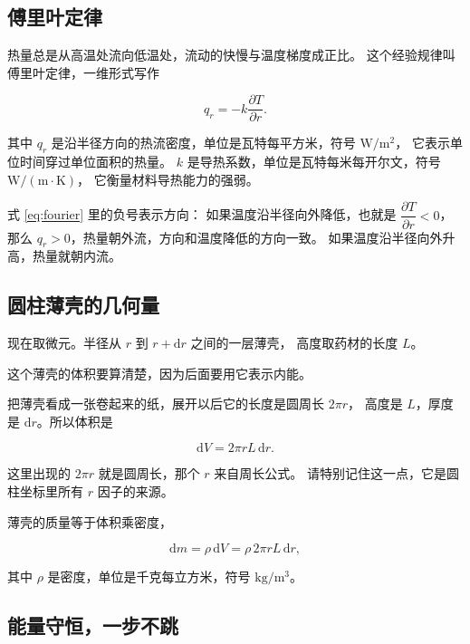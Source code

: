 \subsection{傅里叶定律}

热量总是从高温处流向低温处，流动的快慢与温度梯度成正比。
这个经验规律叫傅里叶定律，一维形式写作

\begin{equation}
q_r = -k\frac{\partial T}{\partial r}.
\label{eq:fourier}
\end{equation}

其中 $q_r$ 是沿半径方向的热流密度，单位是瓦特每平方米，符号 $\mathrm{W/m^2}$，
它表示单位时间穿过单位面积的热量。
$k$ 是导热系数，单位是瓦特每米每开尔文，符号 $\mathrm{W/(m\cdot K)}$，
它衡量材料导热能力的强弱。

式 \eqref{eq:fourier} 里的负号表示方向：
如果温度沿半径向外降低，也就是 $\dfrac{\partial T}{\partial r}<0$，
那么 $q_r>0$，热量朝外流，方向和温度降低的方向一致。
如果温度沿半径向外升高，热量就朝内流。

\subsection{圆柱薄壳的几何量}

现在取微元。半径从 $r$ 到 $r+\mathrm{d}r$ 之间的一层薄壳，
高度取药材的长度 $L$。

这个薄壳的体积要算清楚，因为后面要用它表示内能。

把薄壳看成一张卷起来的纸，展开以后它的长度是圆周长 $2\pi r$，
高度是 $L$，厚度是 $\mathrm{d}r$。所以体积是

\begin{equation}
\mathrm{d}V = 2\pi r L\,\mathrm{d}r .
\label{eq:dV}
\end{equation}

这里出现的 $2\pi r$ 就是圆周长，那个 $r$ 来自周长公式。
请特别记住这一点，它是圆柱坐标里所有 $r$ 因子的来源。

薄壳的质量等于体积乘密度，

\begin{equation}
\mathrm{d}m = \rho\,\mathrm{d}V = \rho\,2\pi r L\,\mathrm{d}r ,
\label{eq:dm}
\end{equation}

其中 $\rho$ 是密度，单位是千克每立方米，符号 $\mathrm{kg/m^3}$。

\subsection{能量守恒，一步不跳}

